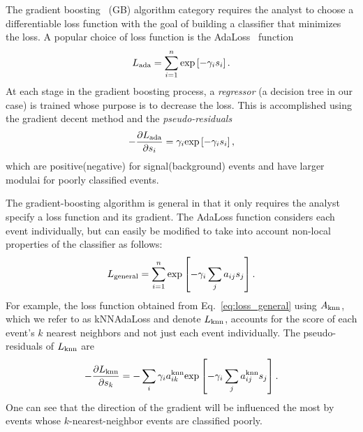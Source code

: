 The gradient boosting~\cite{ref:gradboost} (GB) algorithm category requires the analyst to choose a differentiable loss function with the goal of building a classifier that minimizes the loss.  
A popular choice of loss function is the AdaLoss~\cite{ref:adaboost} function 
\begin{equation}
L_{\rm ada} = \sum\limits_{i=1}^{n} {\rm exp}\left[-\gamma_i s_i\right]. 
\end{equation}
At each stage in the gradient boosting process, a {\em regressor} (a decision tree in our case) is trained whose purpose is to decrease the loss.  This is accomplished using the gradient decent method and the {\em pseudo-residuals}
\begin{equation}
  -\frac{\partial L_{\rm ada}}{\partial s_i} = \gamma_i  {\rm exp}\left[-\gamma_i s_i\right],
\end{equation}
which are positive(negative) for signal(background) events and have larger modulai for poorly classified events.  

The gradient-boosting algorithm is general in that it only requires the analyst specify a loss function and its gradient.  The AdaLoss function considers each event individually, but can easily be modified to take into account non-local properties of the classifier as follows:
\begin{equation}
  \label{eq:loss_general}
  L_{\rm general} = \sum\limits_{i=1}^{n} {\rm exp}\left[-\gamma_i \sum\limits_{j} a_{ij} s_j \right]. 
\end{equation} 
For example, the loss function obtained from Eq.~\ref{eq:loss_general} using $A_{\rm knn}$, which we refer to as kNNAdaLoss and denote $L_{\rm knn}$, accounts for the score of each event's $k$ nearest neighbors and not just each event individually.
The pseudo-residuals of $L_{\rm knn}$ are 
\begin{equation}
  -\frac{\partial L_{\rm knn}}{\partial s_k} = -\sum\limits_i \gamma_i a_{ik}^{\rm knn} {\rm exp}\left[-\gamma_i \sum_j a_{ij}^{\rm knn} s_j \right].
\end{equation}
One can see that the direction of the gradient will be influenced the most by events whose $k$-nearest-neighbor events are classified poorly. 

